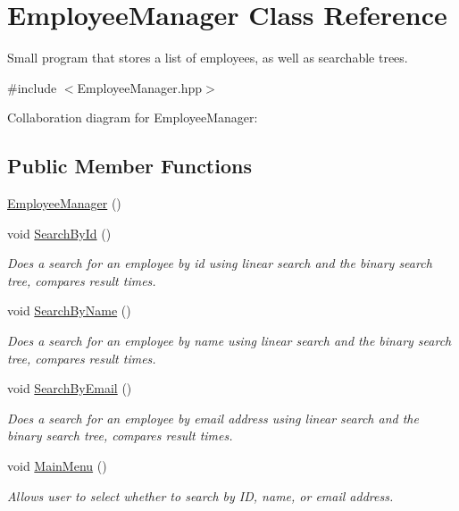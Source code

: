 \hypertarget{classEmployeeManager}{}\section{Employee\+Manager Class Reference}
\label{classEmployeeManager}


Small program that stores a list of employees, as well as searchable trees.  




{\ttfamily \#include $<$Employee\+Manager.\+hpp$>$}



Collaboration diagram for Employee\+Manager\+:
\subsection*{Public Member Functions}
\begin{DoxyCompactItemize}
\item 
\hyperlink{classEmployeeManager_aaa4729386d489d0f263b6fd4b406ad5f}{Employee\+Manager} ()
\item 
void \hyperlink{classEmployeeManager_a01e5b7d43448c1e9f8d2d1f4f1fc537b}{Search\+By\+Id} ()
\begin{DoxyCompactList}\small\item\em Does a search for an employee by id using linear search and the binary search tree, compares result times. \end{DoxyCompactList}\item 
void \hyperlink{classEmployeeManager_a5d0bf6fe40143665f043cba70c0e9654}{Search\+By\+Name} ()
\begin{DoxyCompactList}\small\item\em Does a search for an employee by name using linear search and the binary search tree, compares result times. \end{DoxyCompactList}\item 
void \hyperlink{classEmployeeManager_a33fffec39403a45d3e993bacdeb3582b}{Search\+By\+Email} ()
\begin{DoxyCompactList}\small\item\em Does a search for an employee by email address using linear search and the binary search tree, compares result times. \end{DoxyCompactList}\item 
void \hyperlink{classEmployeeManager_a92e2e329960381bd3ff14f48c76fc7db}{Main\+Menu} ()
\begin{DoxyCompactList}\small\item\em Allows user to select whether to search by ID, name, or email address. \end{DoxyCompactList}\end{DoxyCompactItemize}
